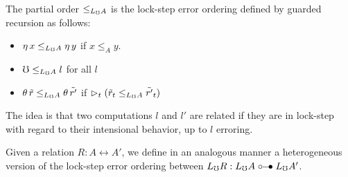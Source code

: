 

The partial order $\le_{L_\mho A}$ is the lock-step error ordering defined by guarded recursion as follows:
%
\begin{itemize}
    \item 	$\eta\, x \le_{L_\mho A} \eta\, y$ if $x \le_A y$.
    \item 	$\mho \le_{L_\mho A} l$ for all $l$ 
    \item   $\theta\, \tilde{r} \le_{L_\mho A} \theta\, \tilde{r'}$ if
            $\vartriangleright_t (\tilde{r}_t \le_{L_\mho A} \tilde{r'}_t)$
  \end{itemize}
%
The idea is that two computations $l$ and $l'$ are related if they are in
lock-step with regard to their intensional behavior, up to $l$ erroring.

Given a relation $R : A \rel A'$, we define in an analogous manner a heterogeneous
version of the lock-step error ordering between $L_\mho R : L_\mho A \mathrel{\circ\mkern-6mu-\mkern-6mu\bullet} L_\mho A'$.




